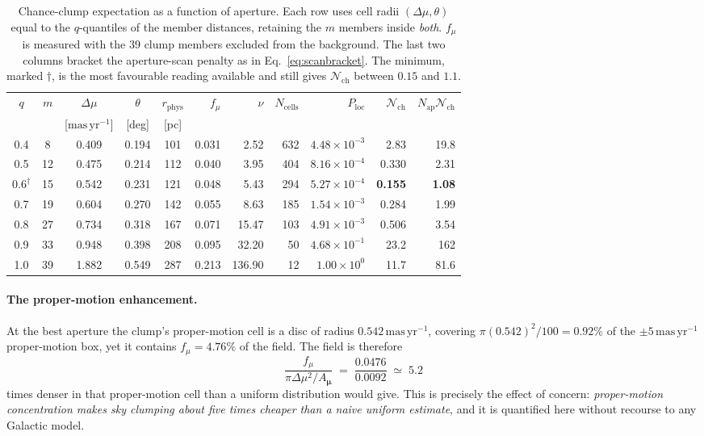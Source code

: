 \documentclass[11pt,a4paper]{article}
\newcommand{\unit}[1]{\ensuremath{\,\mathrm{#1}}}
\newcommand{\masyr}{\unit{mas\,yr^{-1}}}
\newcommand{\pmvec}{\boldsymbol{\mu}}
\newcommand{\Nchance}{\mathcal{N}_{\mathrm{ch}}}
\newcommand{\masyr}{\mathrm{mas\,yr^{-1}}}
\begin{document}
\begin{table}[h]
\centering
\caption{Chance-clump expectation as a function of aperture. Each row uses cell
radii $(\Delta\mu,\theta)$ equal to the $q$-quantiles of the member distances,
retaining the $m$ members inside \emph{both}. $f_\mu$ is measured with the 39
clump members excluded from the background. The last two columns bracket the
aperture-scan penalty as in Eq.~\eqref{eq:scanbracket}. The minimum, marked
$\dagger$, is the most favourable reading available and still gives $\Nchance$
between $0.15$ and $1.1$.}
\label{tab:aperture}
\small
\begin{tabular}{@{}ccccc rrrrrr@{}}
\toprule
$q$ & $m$ & $\Delta\mu$ & $\theta$ & $r_{\mathrm{phys}}$ & $f_\mu$ & $\nu$
& $N_{\mathrm{cells}}$ & $P_{\mathrm{loc}}$ & $\Nchance$ & $N_{\mathrm{ap}}\Nchance$ \\
    &     & [$\mathrm{mas\,yr}^{-1}$] & [deg] & [pc] & & & & & & \\
\midrule
0.4 &  8 & 0.409 & 0.194 & 101 & 0.031 &   2.52 & 632 & $4.48\times10^{-3}$ & 2.83 & 19.8 \\
0.5 & 12 & 0.475 & 0.214 & 112 & 0.040 &   3.95 & 404 & $8.16\times10^{-4}$ & 0.330 & 2.31 \\
$0.6^{\dagger}$ & 15 & 0.542 & 0.231 & 121 & 0.048 & 5.43 & 294 & $5.27\times10^{-4}$ & \textbf{0.155} & \textbf{1.08} \\
0.7 & 19 & 0.604 & 0.270 & 142 & 0.055 &   8.63 & 185 & $1.54\times10^{-3}$ & 0.284 & 1.99 \\
0.8 & 27 & 0.734 & 0.318 & 167 & 0.071 &  15.47 & 103 & $4.91\times10^{-3}$ & 0.506 & 3.54 \\
0.9 & 33 & 0.948 & 0.398 & 208 & 0.095 &  32.20 &  50 & $4.68\times10^{-1}$ & 23.2 & 162 \\
1.0 & 39 & 1.882 & 0.549 & 287 & 0.213 & 136.90 &  12 & $1.00\times10^{0}$  & 11.7 & 81.6 \\
\bottomrule
\end{tabular}
\end{table}

\paragraph{The proper-motion enhancement.}
At the best aperture the clump's proper-motion cell is a disc of radius
$0.542\masyr$, covering $\pi(0.542)^2/100 = 0.92\%$ of the
$\pm5\masyr$ proper-motion box, yet it contains $f_\mu=4.76\%$ of the
field. The field is therefore
%
\begin{equation}
\frac{f_\mu}{\pi\Delta\mu^{2}/A_{\pmvec}} \;=\; \frac{0.0476}{0.0092} \;\simeq\; 5.2
\end{equation}
%
times denser in that proper-motion cell than a uniform distribution would give.
This is precisely the effect of concern: \emph{proper-motion concentration makes
sky clumping about five times cheaper than a naive uniform estimate}, and it is
quantified here without recourse to any Galactic model.
\end{document}
